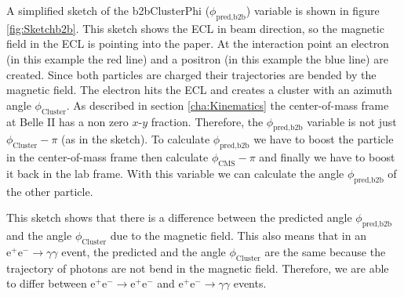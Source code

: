 \documentclass[a4paper,11pt,twosided,final,german,openbib,pdftex,listof=totoc,bibliography=totoc]{scrbook}
\begin{document}
A simplified sketch of the b2bClusterPhi ($\phi_{\textrm{pred,b2b}}$) variable is shown in figure \ref{fig:Sketchb2b}. This sketch shows the ECL in beam direction, so the magnetic field in the ECL is pointing into the paper. At the interaction point an electron (in this example the red line) and a positron (in this example the blue line) are created. Since both particles are charged their trajectories are bended by the magnetic field. The electron hits the ECL and creates a cluster with an azimuth angle $\phi_{\textrm{Cluster}}$. As described in section \ref{cha:Kinematics} the center-of-mass frame at Belle II has a non zero $x$-$y$ fraction. Therefore, the  $\phi_{\textrm{pred,b2b}}$ variable is not just $ \phi_{\textrm{Cluster}} - \pi$ (as in the sketch). To calculate $\phi_{\textrm{pred,b2b}}$ we have to boost the particle in the center-of-mass frame then calculate $ \phi_{\textrm{CMS}}- \pi$ and finally we have to boost it back in the lab frame. With this variable we can calculate the angle $\phi_{\textrm{pred,b2b}}$ of the other particle. 

This sketch shows that there is a difference between the predicted angle $\phi_{\textrm{pred,b2b}}$ and the angle $ \phi_{\textrm{Cluster}}$ due to the magnetic field. This also means that in an $\textrm{e}^+ \textrm{e}^- \rightarrow \gamma \gamma$ event, the predicted and the angle $ \phi_{\textrm{Cluster}}$ are the same because the trajectory of photons are not bend in the magnetic field. Therefore, we are able to differ between $\textrm{e}^+ \textrm{e}^- \rightarrow \textrm{e}^+ \textrm{e}^-$ and $\textrm{e}^+ \textrm{e}^- \rightarrow \gamma \gamma$ events.
\end{document}
